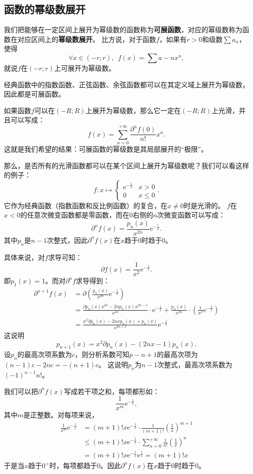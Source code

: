 \documentclass[12pt,UTF8]{ctexbook}
\theoremstyle{definition}
\theoremstyle{plain}
\begin{document}
\begin{appendix}
\section{函数的幂级数展开}

我们把能够在一定区间上展开为幂级数的函数称为\textbf{可展函数}，对应的幂级数称为函数在对应区间上的\textbf{幂级数展开}。
比方说，对于函数$f$，如果有$r>0$和级数$\sum a_n$，使得
$$\forall x\in (-r;r),\,\,\, f(x) = \sum a-n x^n,$$
就说$f$在$(-r;r)$上可展开为幂级数。

经典函数中的指数函数、正弦函数、余弦函数都可以在其定义域上展开为幂级数，因此都是可展函数。

如果函数$f$可以在$(-R;R)$上展开为幂级数，那么它一定在$(-R;R)$上光滑，并且可以写成：
$$ f(x) = \sum_{n=0}^{+\infty} \frac{\partial^n f(0)}{n!} x^n. $$
这就是我们希望的结果：可展函数的幂级数是其局部展开的“极限”。

那么，是否所有的光滑函数都可以在某个区间上展开为幂级数呢？我们可以看这样的例子：
$$ f: x\mapsto \begin{cases} \mathrm{e}^{-\frac{1}{x}} & x > 0 \\ 0 & x \leqslant 0 \end{cases}.$$
它作为经典函数（指数函数和反比例函数）的复合，在$x\neq 0$时是光滑的。
$f$在$x<0$的任意次微变函数都是零函数，而在$0$右侧的$n$次微变函数可以写成：
$$ \partial^n f(x) = \frac{p_n(x)}{x^{2n}} \mathrm{e}^{-\frac{1}{x}}.$$
其中$p_n$是$n-1$次整式，因此$\partial^n f(x)$在$x$趋于$0$时趋于$0$。

具体来说，对$f$求导可知：
$$ \partial f(x) = \frac{1}{x^{2}} \mathrm{e}^{-\frac{1}{x}}. $$
即$p_1(x) = 1$。而对$\partial^n f$求导得到：
\begin{align*}
    \partial^{n+1} f(x) &= \partial \left(\frac{p_n(x)}{x^{2n}} \mathrm{e}^{-\frac{1}{x}}\right) \\
    &= \frac{\partial p_n(x) x^{2n} - 2n p_n(x) x^{2n-1}}{x^{4n}} \cdot \mathrm{e}^{-\frac{1}{x}} + \frac{p_n(x)}{x^{2n}} \cdot \left( \frac{1}{x^{2}} \mathrm{e}^{-\frac{1}{x}}\right) \\
    &= \frac{x^2 \partial p_n(x) - 2nx p_n(x) + p_n(x)}{x^{2n+2}} \mathrm{e}^{-\frac{1}{x}}
\end{align*}
这说明
$$ p_{n+1}(x) = x^2 \partial p_n(x) - (2nx - 1)p_n(x).$$
设$p_n$的最高次项系数为$c$，则分析系数可知$p-{n+1}$的最高次项为$(n-1)c - 2nc = -(n+1)c$。
这说明$p_n$为$n-1$次整式，最高次项系数为$(-1)^{n-1}n!$。

我们可以把$\partial^n f(x)$写成若干项之和，每项都形如：
$$ \frac{1}{x^m} \mathrm{e}^{-\frac{1}{x}},$$
其中$m$是正整数。对每项来说，
\begin{align*}
    \frac{1}{x^m} \mathrm{e}^{-\frac{1}{x}} &= (m+1)!x \mathrm{e}^{-\frac{1}{x}} \cdot \frac{1}{(m+1)!} \left(\frac{1}{x}\right)^{m+1} \\
    &\leqslant (m+1)!x \mathrm{e}^{-\frac{1}{x}} \cdot \sum_{n=0}^{+\infty} \frac{1}{n!} \left(\frac{1}{x}\right)^n \\
    &= (m+1)!x \mathrm{e}^{-\frac{1}{x}} \mathrm{e}^{\frac{1}{x}} = (m+1)!x
\end{align*}
于是当$x$趋于$0^+$时，每项都趋于$0$。因此$\partial^n f(x)$在$x$趋于$0$时趋于$0$。


\end{appendix}
\end{document}
